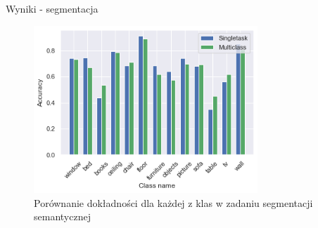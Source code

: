 \documentclass[10pt]{beamer}
\begin{document}
\begin{frame}{Wyniki - segmentacja}
    \begin{figure}
        \includegraphics[width=0.75\textwidth]{images/seg_comp.png}
        \caption{Porównanie dokładności dla każdej z klas w zadaniu segmentacji semantycznej}
    \end{figure}
\end{frame}    
 
    
        


        
\end{document}
